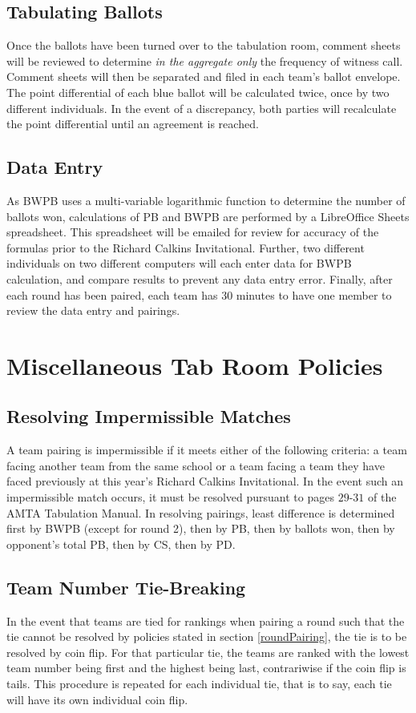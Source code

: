 \documentclass{article}
\begin{document}
\subsection{Tabulating Ballots}
Once the ballots have been turned over to the tabulation room, comment sheets will be reviewed to determine \textit{in the aggregate only} the frequency of witness call.  Comment sheets will then be separated and filed in each team's ballot envelope.  The point differential of each blue ballot will be calculated twice, once by two different individuals.  In the event of a discrepancy, both parties will recalculate the point differential until an agreement is reached.
\subsection{Data Entry}
As BWPB uses a multi-variable logarithmic function to determine the number of ballots won, calculations of PB and BWPB are performed by a LibreOffice Sheets spreadsheet.  This spreadsheet will be emailed for review for accuracy of the formulas prior to the Richard Calkins Invitational.  Further, two different individuals on two different computers will each enter data for BWPB calculation, and compare results to prevent any data entry error.  Finally, after each round has been paired, each team has 30 minutes to have one member to review the data entry and pairings.
\section{Miscellaneous Tab Room Policies}
\subsection{Resolving Impermissible Matches}
\label{impermissible}
A team pairing is impermissible if it meets either of the following criteria:  a team facing another team from the same school or a team facing a team they have faced previously at this year's Richard Calkins Invitational.  In the event such an impermissible match occurs, it must be resolved pursuant to pages $29$-$31$ of the AMTA Tabulation Manual.  In resolving pairings, least difference is determined first by BWPB (except for round 2), then by PB, then by ballots won, then by opponent's total PB, then by CS, then by PD.
\subsection{Team Number Tie-Breaking}
\label{tiebreaking}
In the event that teams are tied for rankings when pairing a round such that the tie cannot be resolved by policies stated in section \ref{roundPairing}, the tie is to be resolved by coin flip.  For that particular tie, the teams are ranked with the lowest team number being first and the highest being last, contrariwise if the coin flip is tails.  This procedure is repeated for each individual tie, that is to say, each tie will have its own individual coin flip.
\end{document}
